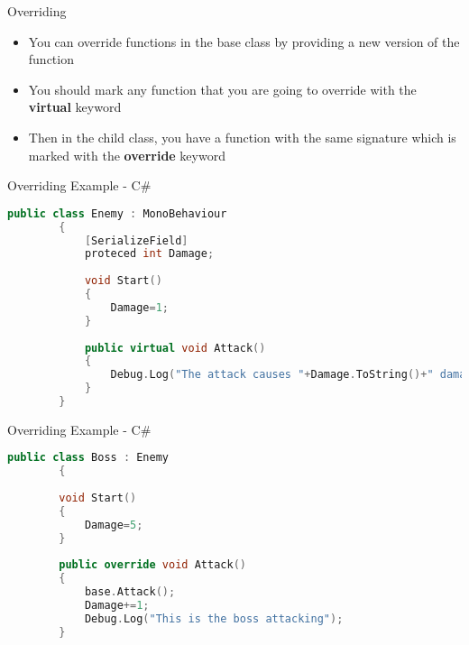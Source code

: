 \begin{frame}{Overriding}
	\begin{itemize}
		\pause \item You can override functions in the base class by providing a new version of the function
		\pause \item You should mark any function that you are going to override with the \textbf{virtual} keyword 
		\pause \item Then in the child class, you have a function with the same signature which is marked with the \textbf{override} keyword
	\end{itemize}
\end{frame}

\begin{frame}[fragile]{Overriding Example - C\#}
	\begin{lstlisting}[language=C++,basicstyle=\tiny,]
		public class Enemy : MonoBehaviour
		{
			[SerializeField]
			proteced int Damage;
		
			void Start()
			{
				Damage=1;
			}
		
			public virtual void Attack()
			{
				Debug.Log("The attack causes "+Damage.ToString()+" damage");
			}
		}
	\end{lstlisting}
\end{frame}

\begin{frame}[fragile]{Overriding Example - C\#}
	\begin{lstlisting}[language=C++,basicstyle=\tiny,]
		public class Boss : Enemy
		{
		
		void Start()
		{
			Damage=5;
		}
		
		public override void Attack()
		{
			base.Attack();
			Damage+=1;
			Debug.Log("This is the boss attacking");
		}
		
	\end{lstlisting}
\end{frame}

